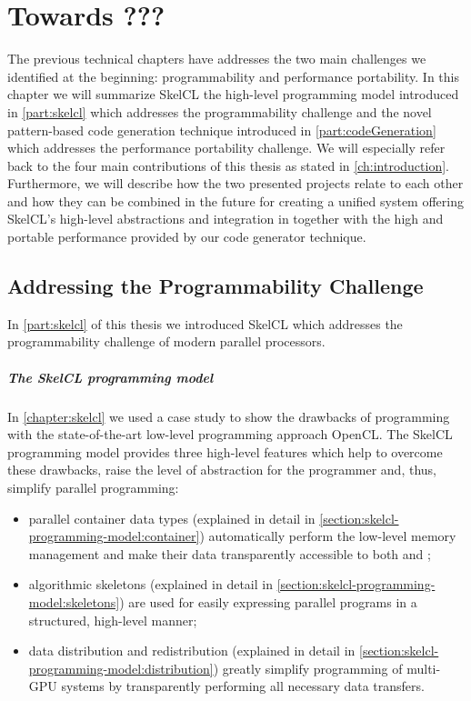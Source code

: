 
\chapter{Towards ???}

\label{ch:seventh} %

The previous technical chapters have addresses the two main challenges we identified at the beginning: programmability and performance portability.
In this chapter we will summarize SkelCL the high-level programming model introduced in \autoref{part:skelcl} which addresses the programmability challenge and the novel pattern-based code generation technique introduced in \autoref{part:codeGeneration} which addresses the performance portability challenge.
We will especially refer back to the four main contributions of this thesis as stated in \autoref{ch:introduction}.
Furthermore, we will describe how the two presented projects relate to each other and how they can be combined in the future for creating a unified system offering SkelCL's high-level abstractions and integration in \Cpp together with the high and portable performance provided by our code generator technique.

\section{Addressing the Programmability Challenge}

In \autoref{part:skelcl} of this thesis we introduced SkelCL which addresses the programmability challenge of modern parallel processors.

\paragraph{The SkelCL programming model}
In \autoref{chapter:skelcl} we used a case study to show the drawbacks of programming with the state-of-the-art low-level programming approach OpenCL.
The SkelCL programming model provides three high-level features which help to overcome these drawbacks, raise the level of abstraction for the programmer and, thus, simplify parallel programming:
\begin{itemize}
  \item parallel container data types (explained in detail in \autoref{section:skelcl-programming-model:container}) automatically perform the low-level memory management and make their data transparently accessible to both \CPU and \GPUs;
  \item algorithmic skeletons (explained in detail in \autoref{section:skelcl-programming-model:skeletons}) are used for easily expressing parallel programs in a structured, high-level manner;
  \item data distribution and redistribution (explained in detail in \autoref{section:skelcl-programming-model:distribution}) greatly simplify programming of multi-GPU systems by transparently performing all necessary data transfers.
\end{itemize}


